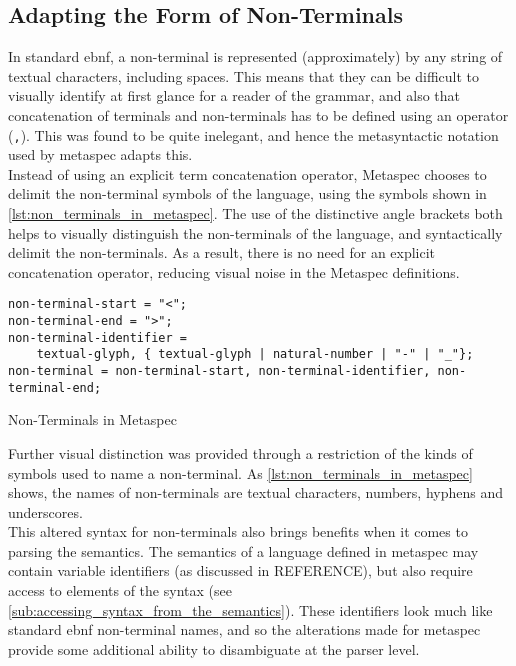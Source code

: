 \subsection{Adapting the Form of Non-Terminals} %
\label{sub:adapting_the_form_of_non_terminals}
In standard \gls{ebnf}, a non-terminal is represented (approximately) by any string of textual characters, including spaces. 
This means that they can be difficult to visually identify at first glance for a reader of the grammar, and also that concatenation of terminals and non-terminals has to be defined using an operator (\texttt{,}).
This was found to be quite inelegant, and hence the metasyntactic notation used by \gls{metaspec} adapts this. \\

Instead of using an explicit term concatenation operator, Metaspec chooses to delimit the non-terminal symbols of the language, using the symbols shown in \autoref{lst:non_terminals_in_metaspec}.
The use of the distinctive angle brackets both helps to visually distinguish the non-terminals of the language, and syntactically delimit the non-terminals.
As a result, there is no need for an explicit concatenation operator, reducing visual noise in the Metaspec definitions.

\begin{listing}[!htb]
\begin{verbatim}
non-terminal-start = "<";
non-terminal-end = ">";
non-terminal-identifier = 
    textual-glyph, { textual-glyph | natural-number | "-" | "_"};
non-terminal = non-terminal-start, non-terminal-identifier, non-terminal-end;
\end{verbatim}
\caption{Non-Terminals in Metaspec}
\label{lst:non_terminals_in_metaspec}
\end{listing}

Further visual distinction was provided through a restriction of the kinds of symbols used to name a non-terminal.
As \autoref{lst:non_terminals_in_metaspec} shows, the names of non-terminals are textual characters, numbers, hyphens and underscores. \\

This altered syntax for non-terminals also brings benefits when it comes to parsing the semantics. 
The semantics of a language defined in metaspec may contain variable identifiers (as discussed in REFERENCE), but also require access to elements of the syntax (see \autoref{sub:accessing_syntax_from_the_semantics}).
These identifiers look much like standard \gls{ebnf} non-terminal names, and so the alterations made for \gls{metaspec} provide some additional ability to disambiguate at the parser level. 

